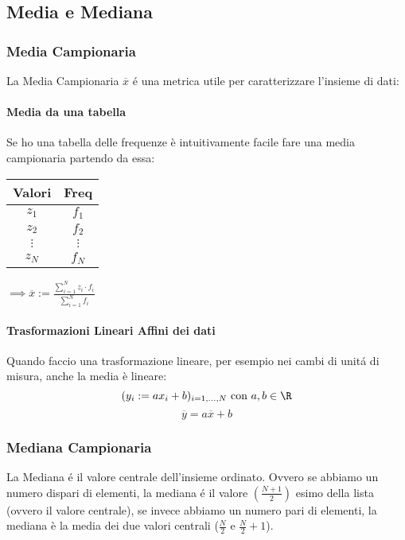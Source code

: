 \subsection{Media e Mediana}
\subsubsection{Media Campionaria}
La Media Campionaria $\overline{x}$ é una metrica utile per caratterizzare l'insieme di dati:

\paragraph{Media da una tabella}
Se ho una tabella delle frequenze è intuitivamente facile fare una media campionaria partendo da essa:
\begin{center}
    \begin{tabular}{ c|c }
        Valori & Freq\\
        \hline
        $z_1$& $f_1$ \\
        $z_2$& $f_2$ \\
        $\vdots$ & $\vdots$ \\
        $z_N$& $f_N$ 
    \end{tabular}
    $ \implies \overline{x} := \frac{\sum_{i=1}^{N} z_i \cdot f_i}{\sum_{i=1}^{N} f_i}$
\end{center}

\paragraph{Trasformazioni Lineari Affini dei dati}
Quando faccio una trasformazione lineare, per esempio nei cambi di unitá di misura, anche la media è lineare:
$$ (y_i := a x_i + b)_{i=1,...,N} \text{ con } a,b \in \R $$
$$ \overline{y} = a \overline{x} + b $$


\subsubsection{Mediana Campionaria}
La Mediana é il valore centrale dell'insieme ordinato.
Ovvero se abbiamo un numero dispari di elementi, la mediana é il valore $(\frac{N+1}{2})$ esimo della lista (ovvero il valore centrale), se invece abbiamo
un numero pari di elementi, la mediana è la media dei due valori centrali ($\frac{N}{2}$ e $\frac{N}{2}+1$).

